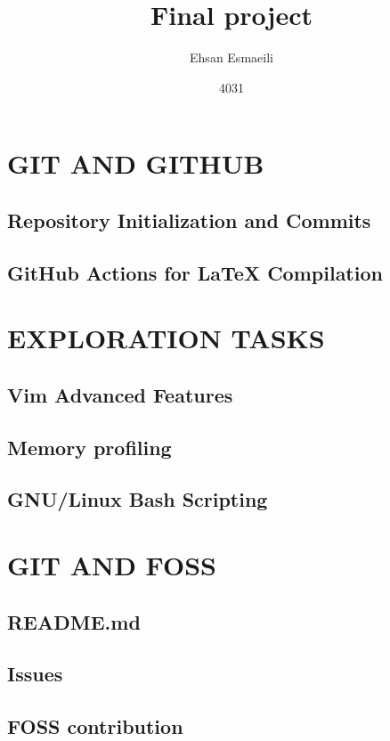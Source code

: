 \documentclass{article}
\title{Final project}
\date{4031}
\author{Ehsan Esmaeili}
\begin{document}
\maketitle
\newpage

\tableofcontents

\newpage

\section{GIT AND GITHUB}

\subsection{Repository Initialization and Commits}

\subsection{GitHub Actions for LaTeX Compilation}

\newpage

\section{EXPLORATION TASKS}

\subsection{Vim Advanced Features}

\subsection{Memory profiling}

\subsection{GNU/Linux Bash Scripting}
\newpage

\section{GIT AND FOSS}

\subsection{README.md}

\subsection{Issues}

\subsection{FOSS contribution}
\end{document}
